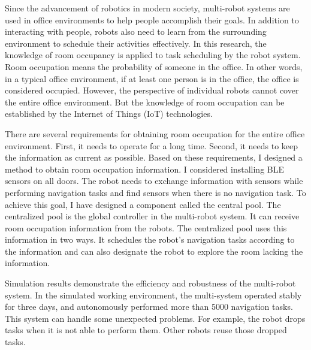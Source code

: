 
Since the advancement of robotics in modern society, multi-robot systems are used in office environments to help people accomplish their goals. In addition to interacting with people, robots also need to learn from the surrounding environment to schedule their activities effectively. 
In this research, the knowledge of room occupancy is applied to task scheduling by the robot system. Room occupation means the probability of someone in the office.  In other words, in a typical office environment,  if at least one person is in the office, the office is considered occupied. However, the perspective of individual robots cannot cover the entire office environment. But the knowledge of room occupation can be established by the Internet of Things (IoT) technologies.

There are several requirements for obtaining room occupation for the entire office environment. First, it needs to operate for a long time. Second, it needs to keep the information as current as possible. Based on these requirements, I designed a method to obtain room occupation information. I considered installing BLE sensors on all doors. The robot needs to exchange information with sensors while performing navigation tasks and find sensors when there is no navigation task. To achieve this goal, I have designed a component called the central pool. The centralized pool is the global controller in the multi-robot system. It can receive room occupation information from the robots. 
The centralized pool uses this information in two ways. It schedules the robot's navigation tasks according to the information and can also designate the robot to explore the room lacking the information.

Simulation results demonstrate the efficiency and robustness of the multi-robot system. In the simulated working environment, the multi-system operated stably for three days, and autonomously performed more than 5000 navigation tasks. This system can handle some unexpected problems. For example, the robot drops tasks when it is not able to perform them. Other robots reuse those dropped tasks.


\cleardoublepage
